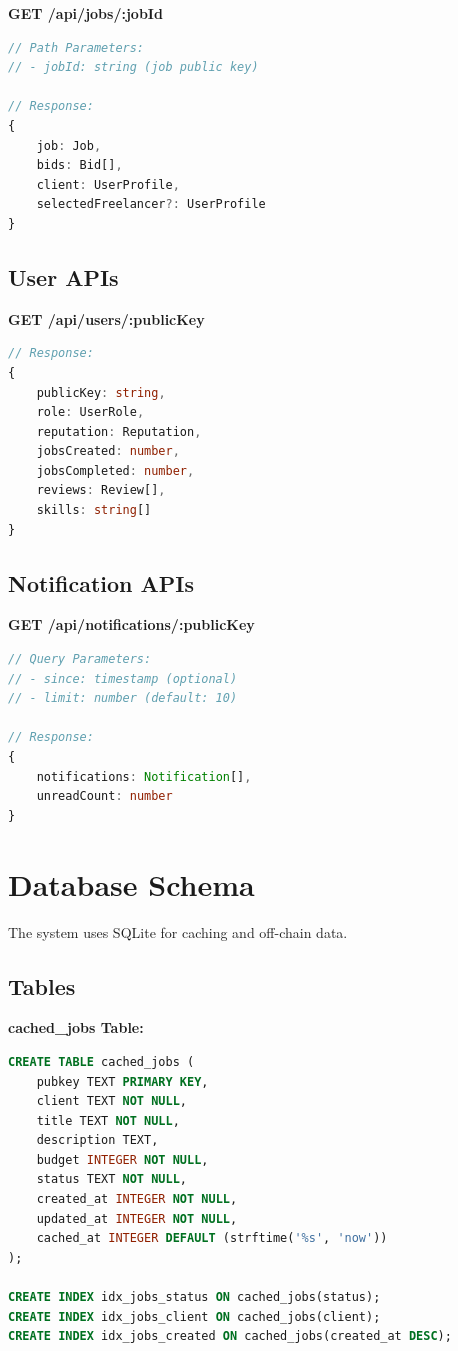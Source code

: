 \documentclass[a4paper,13pt,twoside]{report}
\theoremstyle{definition}
\begin{document}
\textbf{GET /api/jobs/:jobId}
\begin{lstlisting}[language=TypeScript]
// Path Parameters:
// - jobId: string (job public key)

// Response:
{
    job: Job,
    bids: Bid[],
    client: UserProfile,
    selectedFreelancer?: UserProfile
}
\end{lstlisting}

\subsection{User APIs}

\textbf{GET /api/users/:publicKey}
\begin{lstlisting}[language=TypeScript]
// Response:
{
    publicKey: string,
    role: UserRole,
    reputation: Reputation,
    jobsCreated: number,
    jobsCompleted: number,
    reviews: Review[],
    skills: string[]
}
\end{lstlisting}

\subsection{Notification APIs}

\textbf{GET /api/notifications/:publicKey}
\begin{lstlisting}[language=TypeScript]
// Query Parameters:
// - since: timestamp (optional)
// - limit: number (default: 10)

// Response:
{
    notifications: Notification[],
    unreadCount: number
}
\end{lstlisting}

\section{Database Schema}

The system uses SQLite for caching and off-chain data.

\subsection{Tables}

\textbf{cached\_jobs Table:}
\begin{lstlisting}[language=SQL]
CREATE TABLE cached_jobs (
    pubkey TEXT PRIMARY KEY,
    client TEXT NOT NULL,
    title TEXT NOT NULL,
    description TEXT,
    budget INTEGER NOT NULL,
    status TEXT NOT NULL,
    created_at INTEGER NOT NULL,
    updated_at INTEGER NOT NULL,
    cached_at INTEGER DEFAULT (strftime('%s', 'now'))
);

CREATE INDEX idx_jobs_status ON cached_jobs(status);
CREATE INDEX idx_jobs_client ON cached_jobs(client);
CREATE INDEX idx_jobs_created ON cached_jobs(created_at DESC);
\end{lstlisting}
\end{document}
